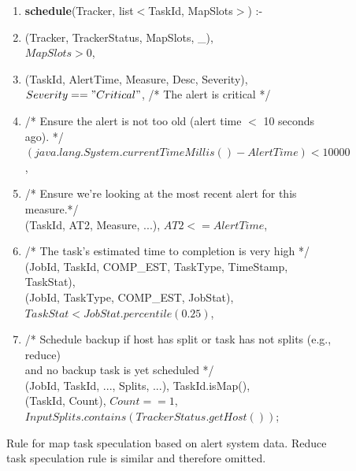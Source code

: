 \begin{figure}
\ssp
\centering
\begin{boxedminipage}{\linewidth}
\begin{enumerate} \itemsep0pt

\item {\bf schedule}(Tracker, list$<$TaskId, MapSlots$>$) :-
\item \label{tsp:heartbeat} (Tracker, TrackerStatus, MapSlots, \_),  \\
					\datalogspace $MapSlots > 0$, \\

\item \label{tsp:alert} (TaskId, AlertTime, Measure, Desc, Severity), \\
				 \datalogspace $Severity == "Critical"$,  /* The alert is critical */  \\

\item  \label{tsp:recent} \datalogspace /* Ensure the alert is not too old (alert time $<$ 10 seconds ago). */  \\
					\datalogspace $(java.lang.System.currentTimeMillis() - AlertTime) < 10000$,  \\

\item \label{tsp:up2date} \datalogspace /* Ensure we're looking at the most recent alert for this measure.*/ \\
				       (TaskId, AT2, Measure, ...), $AT2 <= AlertTime$, \\

\item \label{tsp:compest}  \datalogspace  /* The task's estimated time to completion is very high */ \\
				         (JobId, TaskId, COMP\_EST, TaskType, TimeStamp, TaskStat), \\
					(JobId, TaskType, COMP\_EST, JobStat),  \\
					\datalogspace $TaskStat < JobStat.percentile(0.25)$,  \\

\item \label{tsp:backup} \datalogspace /* Schedule backup if host has split or task has not splits (e.g., reduce) \\
          \datalogspace  \xspace and no backup task is yet scheduled */ \\
	(JobId, TaskId, ..., Splits, ...), TaskId.isMap(), \\
	(TaskId, Count), $Count == 1$, \\
	\datalogspace $InputSplits.contains(TrackerStatus.getHost())$; \\
\end{enumerate}
\end{boxedminipage}
\caption{\label{ch:hop:fig:speculation} Rule for map task speculation based on alert system data. Reduce task 
speculation rule is similar and therefore omitted. }
\end{figure}    
   
